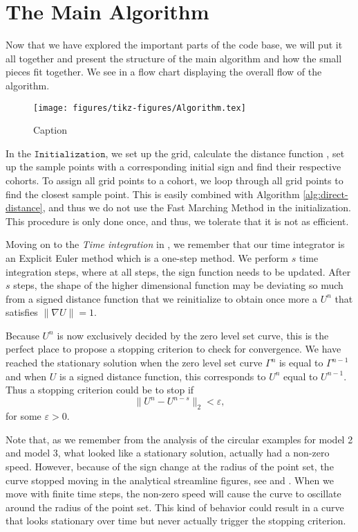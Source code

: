 \section{The Main Algorithm} \label{sec:main-alg}
Now that we have explored the important parts of the code base, we will put it all together and present the structure of the main algorithm and how the small pieces fit together. We see in  a flow chart displaying the overall flow of the algorithm. 

\begin{figure}
    \centering
    \texttt{[image: figures/tikz-figures/Algorithm.tex]}
    \caption[Algorithm - overview]{Caption}
    \label{fig:flow-algorithm}
\end{figure}

In the $\texttt{Initialization}$, we set up the grid, calculate the distance function \distanceV, set up the sample points with a corresponding initial sign and find their respective cohorts. To assign all grid points to a cohort, we loop through all grid points to find the closest sample point. This is easily combined with Algorithm \ref{alg:direct-distance}, and thus we do not use the Fast Marching Method in the initialization. This procedure is only done once, and thus, we tolerate that it is not as efficient. 

Moving on to the \textit{Time integration} in , we remember that our time integrator is an Explicit Euler method which is a one-step method. We perform $s$ time integration steps, where at all steps, the sign function needs to be updated. After $s$ steps, the shape of the higher dimensional function may be deviating so much from a signed distance function that we reinitialize to obtain once more a $U^n$ that satisfies $\|\nabla U\|=1$.

Because $U^n$ is now exclusively decided by the zero level set curve, this is the perfect place to propose a stopping criterion to check for convergence. We have reached the stationary solution when the zero level set curve $\Gamma^n$ is equal to $\Gamma^{n-1}$ and when $U$ is a signed distance function, this corresponds to $U^n$ equal to $U^{n-1}$. Thus a stopping criterion could be to stop if 
\begin{equation}
    \|U^n - U^{n-s}\|_2 < \varepsilon,
    \label{eq:stopping-criterion}
\end{equation}
for some $\varepsilon>0$.

Note that, as we remember from the analysis of the circular examples for model 2 and model 3, what looked like a stationary solution, actually had a non-zero speed. However, because of the sign change at the radius of the point set, the curve stopped moving in the analytical streamline figures, see  and . When we move with finite time steps, the non-zero speed will cause the curve to oscillate around the radius of the point set. This kind of behavior could result in a curve that looks stationary over time but never actually trigger the stopping criterion.

